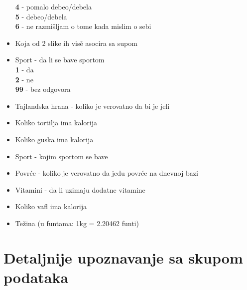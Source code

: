 \documentclass[12pt,a4paper]{article}
\begin{document}
\begin{itemize}
    \textbf{4} - pomalo debeo/debela\\
    \textbf{5} - debeo/debela\\
    \textbf{6} - ne razmi\v sljam o tome kada mislim o sebi
  \item Koja od 2 slike ih vis\v e asocira sa supom
  \item Sport - da li se bave sportom\\
    \textbf{1} - da\\
    \textbf{2} - ne\\
    \textbf{99} - bez odgovora
  \item Tajlandska hrana - koliko je verovatno da bi je jeli
  \item Koliko tortilja ima kalorija
  \item Koliko guska ima kalorija
  \item Sport - kojim sportom se bave
  \item Povr\' ce - koliko je verovatno da jedu povr\' ce na dnevnoj bazi
  \item Vitamini - da li uzimaju dodatne vitamine
  \item Koliko vafl ima kalorija
  \item Te\v zina (u funtama: 1kg = 2.20462 funti)\\
\end{itemize}

\newpage

\section{Detaljnije upoznavanje sa skupom podataka}
\end{document}
